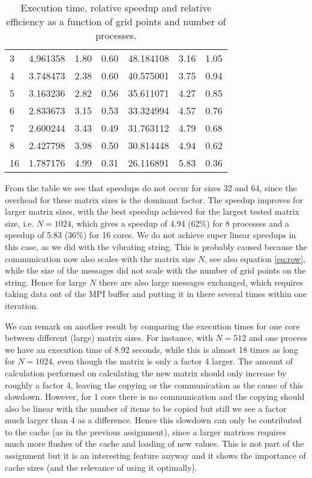 \documentclass[11pt,a4paper,onecolumn]{article}
\begin{document}
\begin{table}[H]
\begin{tabular}{l | c | c | c | c | c | c}
    3 & 4.961358 & 1.80 & 0.60 & 48.184108 & 3.16 & 1.05\\
    4 & 3.748473 & 2.38 & 0.60 & 40.575001 & 3.75 & 0.94\\
    5 & 3.163236 & 2.82 & 0.56 & 35.611071 & 4.27 & 0.85\\
    6 & 2.833673 & 3.15 & 0.53 & 33.324994 & 4.57 & 0.76\\
    7 & 2.600244 & 3.43 & 0.49 & 31.763112 & 4.79 & 0.68\\
    8 & 2.427798 & 3.98 & 0.50 & 30.814448 & 4.94 & 0.62\\
    16 & 1.787176 & 4.99 & 0.31 & 26.116891 & 5.83 & 0.36 \\
  \end{tabular}
  \caption{Execution time, relative speedup and relative efficiency as a function of grid points and number of processes.}
  \label{tab:diff}
\end{table}

From the table we see that speedups do not occur for sizes 32 and 64, since the overhead for these matrix sizes is the dominant factor. The speedup improves for larger matrix sizes, with the best speedup achieved for the largest tested matrix size, i.e. $N = 1024$, which gives a speedup of 4.94 (62\%) for 8 processes and a speedup of 5.83 (36\%) for 16 cores. We do not achieve super linear speedups in this case, as we did with the vibrating string. This is probably caused because the communication now also scales with the matrix size $N$, see also equation \ref{eq:row}, while the size of the messages did not scale with the number of grid points on the string. Hence for large $N$ there are also large messages exchanged, which requires taking data out of the MPI buffer and putting it in there several times within one iteration. 

We can remark on another result by comparing the execution times for one core between different (large) matrix sizes. For instance, with $N = 512$ and one process we have an execution time of 8.92 seconds, while this is almost 18 times as long for $N = 1024$, even though the matrix is only a factor 4 larger. The amount of calculation performed on calculating the new matrix should only increase by roughly a factor 4, leaving the copying or the communication as the cause of this slowdown. However, for 1 core there is no communication and the copying should also be linear with the number of items to be copied but still we see a factor much larger than 4 as a difference. Hence this slowdown can only be contributed to the cache (as in the previous assignment), since a larger matrices requires much more flushes of the cache and loading of new values. This is not part of the assignment but it is an interesting feature anyway and it shows the importance of cache sizes (and the relevance of using it optimally). 
\end{document}
